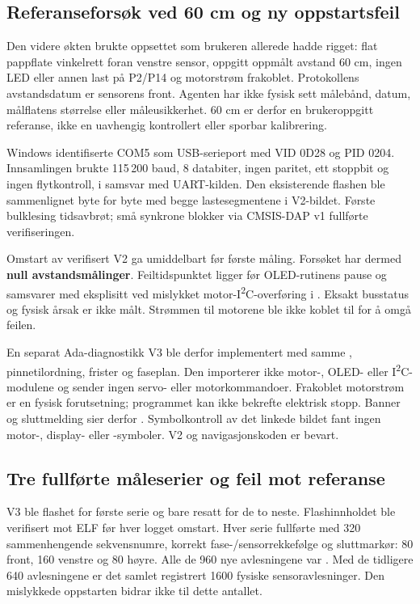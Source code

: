 \clearpage
\subsection{Referanseforsøk ved 60 cm og ny oppstartsfeil}\label{sec:reference60}
Den videre økten brukte oppsettet som brukeren allerede hadde rigget:
flat pappflate vinkelrett foran venstre sensor, oppgitt oppmålt avstand
60 cm, ingen LED eller annen last på P2/P14 og motorstrøm frakoblet.
Protokollens avstandsdatum er sensorens front. Agenten har ikke fysisk
sett målebånd, datum, målflatens størrelse eller måleusikkerhet.
60 cm er derfor en brukeroppgitt referanse, ikke en uavhengig kontrollert
eller sporbar kalibrering.

Windows identifiserte COM5 som USB-serieport med VID 0D28 og PID 0204.
Innsamlingen brukte 115\,200 baud, 8 databiter, ingen paritet, ett
stoppbit og ingen flytkontroll, i samsvar med UART-kilden.
Den eksisterende flashen ble sammenlignet byte for byte med begge
lastesegmentene i V2-bildet. Første bulklesing tidsavbrøt; små
synkrone blokker via CMSIS-DAP v1 fullførte verifiseringen.

Omstart av verifisert V2 ga 
umiddelbart før første måling. Forsøket  har dermed
\textbf{null avstandsmålinger}. Feiltidspunktet ligger før OLED-rutinens
pause og samsvarer med eksplisitt  ved mislykket
motor-I\textsuperscript{2}C-overføring i
. Eksakt busstatus og fysisk
årsak er ikke målt. Strømmen til motorene ble ikke koblet til for å
omgå feilen.

En separat Ada-diagnostikk V3 ble derfor implementert med samme
, pinnetilordning, frister og faseplan.
Den importerer ikke motor-, OLED- eller I\textsuperscript{2}C-modulene
og sender ingen servo- eller motorkommandoer. Frakoblet motorstrøm
er en fysisk forutsetning; programmet kan ikke bekrefte elektrisk stopp.
Banner og sluttmelding sier derfor .
Symbolkontroll av det linkede bildet fant ingen motor-, display- eller
-symboler. V2 og navigasjonskoden er bevart.

\subsection{Tre fullførte måleserier og feil mot referanse}
V3 ble flashet for første serie og bare resatt for de to neste.
Flashinnholdet ble verifisert mot ELF før hver logget omstart.
Hver serie fullførte med 320 sammenhengende sekvensnumre, korrekt
fase-/sensorrekkefølge og sluttmarkør: 80 front, 160 venstre og 80 høyre.
Alle de 960 nye avlesningene var . Med de tidligere
640 avlesningene er det samlet registrert 1600 fysiske sensoravlesninger.
Den mislykkede oppstarten bidrar ikke til dette antallet.


